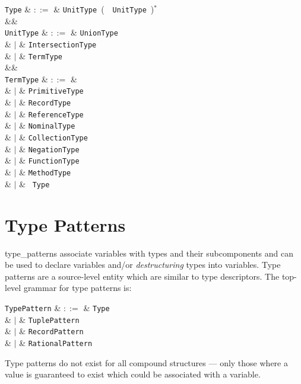 \begin{syntax}
  \verb+Type+ & $::=$ & \verb+UnitType+\ \big(\ \token{,}\ \verb+UnitType+\ \big)$^*$\\
  &&\\
  \verb+UnitType+ & $::=$ & \verb+UnionType+ \\
              & $|$ & \verb+IntersectionType+ \\
              & $|$ & \verb+TermType+ \\
              &&\\
  \verb+TermType+ & $::=$ & \\
  & $|$ & \verb+PrimitiveType+ \\
  & $|$ & \verb+RecordType+ \\
  & $|$ & \verb+ReferenceType+ \\
  & $|$ & \verb+NominalType+ \\
  & $|$ & \verb+CollectionType+ \\
  & $|$ & \verb+NegationType+ \\
  & $|$ & \verb+FunctionType+ \\
  & $|$ & \verb+MethodType+ \\
  & $|$ & \token{(}\ \verb+Type+\ \token{)}\\
\end{syntax}

\section{Type Patterns}
\label{c_types_type_patterns}

\Gls{type_pattern}s associate variables with types and their subcomponents and can be used to declare variables and/or {\em destructuring} types into variables.  Type patterns are a source-level entity which are similar to type descriptors.  The top-level grammar for type patterns is:

\begin{syntax}
  \verb+TypePattern+ & $::=$ & \verb+Type+ \\
              & $|$ & \verb+TuplePattern+ \\
              & $|$ & \verb+RecordPattern+ \\
              & $|$ & \verb+RationalPattern+ \\
\end{syntax}

Type patterns do not exist for all compound structures --- only those where a value is guaranteed to exist which could be associated with a variable.

